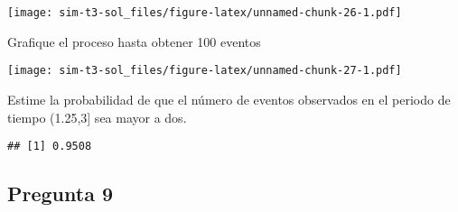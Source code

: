 \documentclass[]{article}
\newenvironment{Shaded}{\begin{snugshade}}{\end{snugshade}}
\newcommand{\ControlFlowTok}[1]{\textcolor[rgb]{0.13,0.29,0.53}{\textbf{#1}}}
\newcommand{\DataTypeTok}[1]{\textcolor[rgb]{0.13,0.29,0.53}{#1}}
\newcommand{\DecValTok}[1]{\textcolor[rgb]{0.00,0.00,0.81}{#1}}
\newcommand{\FloatTok}[1]{\textcolor[rgb]{0.00,0.00,0.81}{#1}}
\newcommand{\KeywordTok}[1]{\textcolor[rgb]{0.13,0.29,0.53}{\textbf{#1}}}
\newcommand{\NormalTok}[1]{#1}
\newcommand{\OperatorTok}[1]{\textcolor[rgb]{0.81,0.36,0.00}{\textbf{#1}}}
\newcommand{\StringTok}[1]{\textcolor[rgb]{0.31,0.60,0.02}{#1}}
\begin{document}
\texttt{[image: sim-t3-sol\_files/figure-latex/unnamed-chunk-26-1.pdf]}

Grafique el proceso hasta obtener 100 eventos

\begin{Shaded}
\end{Shaded}

\texttt{[image: sim-t3-sol\_files/figure-latex/unnamed-chunk-27-1.pdf]}

Estime la probabilidad de que el número de eventos observados en el
periodo de tiempo (1.25,3{]} sea mayor a dos.

\begin{Shaded}
\end{Shaded}

\begin{verbatim}
## [1] 0.9508
\end{verbatim}

\hypertarget{pregunta-9}{%
\subsection{Pregunta 9}\label{pregunta-9}}
\end{document}
